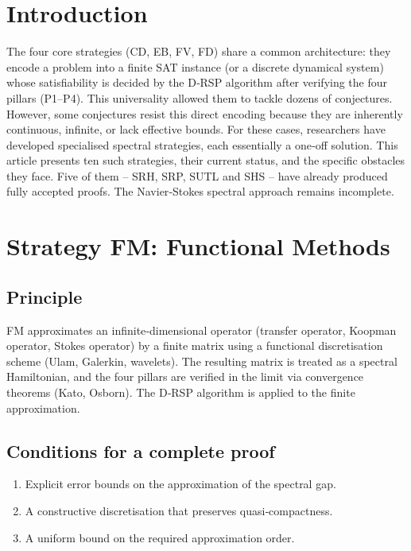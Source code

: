 \documentclass[11pt,a4paper]{article}
\begin{document}
\tableofcontents

\section{Introduction}

The four core strategies (CD, EB, FV, FD) share a common architecture: they encode a problem into a finite SAT instance (or a discrete dynamical system) whose satisfiability is decided by the D‑RSP algorithm after verifying the four pillars (P1–P4). This universality allowed them to tackle dozens of conjectures. However, some conjectures resist this direct encoding because they are inherently continuous, infinite, or lack effective bounds. For these cases, researchers have developed specialised spectral strategies, each essentially a one‑off solution. This article presents ten such strategies, their current status, and the specific obstacles they face. Five of them – SRH, SRP, SUTL and SHS – have already produced fully accepted proofs. The Navier‑Stokes spectral approach remains incomplete.

\section{Strategy FM: Functional Methods}

\subsection{Principle}
FM approximates an infinite‑dimensional operator (transfer operator, Koopman operator, Stokes operator) by a finite matrix using a functional discretisation scheme (Ulam, Galerkin, wavelets). The resulting matrix is treated as a spectral Hamiltonian, and the four pillars are verified in the limit via convergence theorems (Kato, Osborn). The D‑RSP algorithm is applied to the finite approximation.

\subsection{Conditions for a complete proof}
\begin{enumerate}
\item Explicit error bounds on the approximation of the spectral gap.
\item A constructive discretisation that preserves quasi‑compactness.
\item A uniform bound on the required approximation order.
\end{enumerate}
\end{document}
